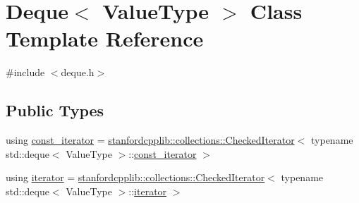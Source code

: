 \hypertarget{classDeque}{}\section{Deque$<$ Value\+Type $>$ Class Template Reference}
\label{classDeque}


{\ttfamily \#include $<$deque.\+h$>$}

\subsection*{Public Types}
\begin{DoxyCompactItemize}
\item 
using \mbox{\hyperlink{classDeque_a82e5b35971ca4096ad8c03687e86f11f}{const\+\_\+iterator}} = \mbox{\hyperlink{classstanfordcpplib_1_1collections_1_1CheckedIterator}{stanfordcpplib\+::collections\+::\+Checked\+Iterator}}$<$ typename std\+::deque$<$ Value\+Type $>$\+::\mbox{\hyperlink{classDeque_a82e5b35971ca4096ad8c03687e86f11f}{const\+\_\+iterator}} $>$
\item 
using \mbox{\hyperlink{classDeque_af87a5290666b1bb4bf3e44cafc305ad5}{iterator}} = \mbox{\hyperlink{classstanfordcpplib_1_1collections_1_1CheckedIterator}{stanfordcpplib\+::collections\+::\+Checked\+Iterator}}$<$ typename std\+::deque$<$ Value\+Type $>$\+::\mbox{\hyperlink{classDeque_af87a5290666b1bb4bf3e44cafc305ad5}{iterator}} $>$
\end{DoxyCompactItemize}
